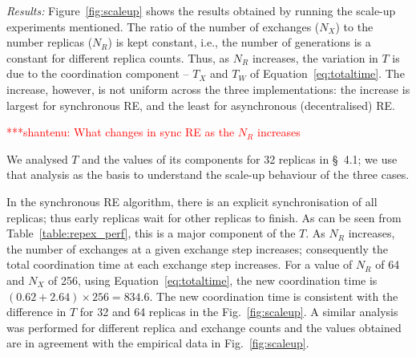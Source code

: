 \documentclass{rspublic}
\newcommand{\jhanote}[1]{ {\textcolor{red} { ***shantenu: #1 }}}
\newcommand{\alnote}[1]{ {\textcolor{blue} { ***andre: #1 }}}
\newcommand{\alnote}[1]{}
\newcommand{\jhanote}[1]{}
\begin{document}

{\it Results:} Figure~\ref{fig:scaleup} shows the results obtained by
running the scale-up experiments mentioned.  The ratio of the number
of exchanges ($N_X$) to the number replicas ($N_R$) is kept constant,
i.e., the number of generations is a constant for different replica
counts.  Thus, as $N_R$ increases, the variation in $T$ is due to the
coordination component -- $T_X$ and $T_W$ of Equation~\ref{eq:totaltime}.
The increase, however, is not uniform across the three
implementations: the increase is largest for synchronous RE, and the
least for asynchronous (decentralised) RE.





\jhanote{What changes in sync RE as the $N_R$ increases} 

We analysed $T$ and the values of its components for 32 replicas in
\S~4.1; we use that analysis as the basis to understand the 
scale-up behaviour of the three cases.
 
In the synchronous RE algorithm, there is an explicit synchronisation
of all replicas; thus early replicas wait for other replicas to
finish. As can be seen from Table~\ref{table:repex_perf}, this is a
major component of the $T$.  As $N_R$ increases, the number of
exchanges at a given exchange step increases; consequently the total
coordination time at each exchange step increases.  For a value of
$N_R$ of 64 and $N_X$ of 256, using Equation~\ref{eq:totaltime}, the new
coordination time is $(0.62+2.64) \times 256 = 834.6$.  The new coordination
time is consistent with the difference in $T$ for 32 and 64 replicas
in the Fig.~\ref{fig:scaleup}. A similar analysis was performed for
different replica and exchange counts and the values obtained are in
agreement with the empirical data in Fig.~\ref{fig:scaleup}.

\end{document}
